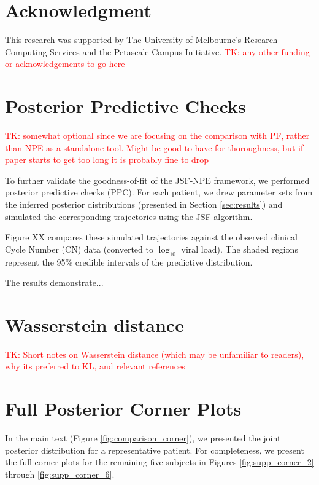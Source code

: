 \documentclass{article}
\begin{document}
\section{Acknowledgment}
This research was supported by The University of Melbourne’s Research Computing Services and the Petascale Campus Initiative. \textcolor{red}{TK: any other funding or acknowledgements to go here}


  


\appendix



\appendix
\section{Posterior Predictive Checks} \label{app:ppc}
\textcolor{red}{TK: somewhat optional since we are focusing on the comparison with PF, rather than NPE as a standalone tool. Might be good to have for thoroughness, but if paper starts to get too long it is probably fine to drop}


To further validate the goodness-of-fit of the JSF-NPE framework, we performed posterior predictive checks (PPC). For each patient, we drew parameter sets from the inferred posterior distributions (presented in Section \ref{sec:results}) and simulated the corresponding trajectories using the JSF algorithm. 

Figure XX compares these simulated trajectories against the observed clinical Cycle Number (CN) data (converted to $\log_{10}$ viral load). The shaded regions represent the 95\% credible intervals of the predictive distribution.

The results demonstrate...



\section{Wasserstein distance} \label{sec:wasserstein}



\textcolor{red}{TK: Short notes on Wasserstein distance (which may be unfamiliar to readers), why its preferred to KL, and relevant references}

\section{Full Posterior Corner Plots}

In the main text (Figure \ref{fig:comparison_corner}), we presented the joint posterior distribution for a representative patient. For completeness, we present the full corner plots for the remaining five subjects in Figures \ref{fig:supp_corner_2} through \ref{fig:supp_corner_6}. 
\end{document}
